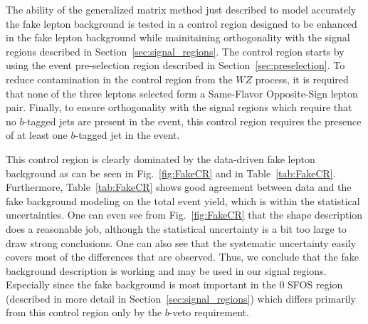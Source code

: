The ability of the generalized matrix method just described to model accurately
the fake lepton background is tested in a control region designed to be enhanced
in the fake lepton background while mainitaining orthogonality with the signal
regions described in Section~\ref{sec:signal_regions}. The control region 
starts by using the event pre-selection region described in Section~\ref{sec:preselection}. To reduce contamination in the 
control region from the $WZ$ process, it is required that none
of the three leptons selected form a Same-Flavor Opposite-Sign lepton pair.
Finally, to ensure orthogonality with the signal regions which require that no
$b$-tagged jets are present in the event, this control region requires
the presence of at least one $b$-tagged jet in the event. 

This control region
is clearly dominated by the data-driven fake lepton background as can
be seen in Fig.~\ref{fig:FakeCR} and in Table~\ref{tab:FakeCR}. 
Furthermore, Table~\ref{tab:FakeCR} shows good agreement between data
and the fake background modeling on the total event yield, which is within 
the statistical uncertainties.  One can even see from
Fig.~\ref{fig:FakeCR} that the shape description does a reasonable job,
although the statistical uncertainty is a bit too large to draw strong conclusions.
One can also see that the systematic uncertainty easily covers most
of the differences that are observed. Thus, we conclude that the fake background
description is working and may be used in our signal regions.  Especially since
the fake background is most important in the 0 SFOS region (described in more
detail in Section~\ref{sec:signal_regions}) which differs primarily from this
control region only by the $b$-veto requirement.




